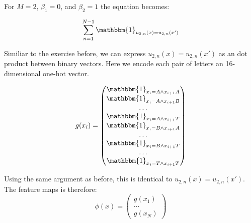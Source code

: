 For $M=2$, $\beta_1=0$, and $\beta_2=1$ the equation becomes:

\begin{equation}
    \sum_{n=1}^{N-1} \mathbbm{1}_{u_{2,n}(x) = u_{2,n}(x')}
\end{equation}

Similiar to the exercise before, we can express $u_{2,n}(x) = u_{2,n}(x')$
as an dot product between binary vectors. Here we encode each pair of letters
an 16-dimensional one-hot vector.

\begin{equation}
    g(x_i) = \begin{pmatrix}
            \mathbbm{1}_{x_i = A \land x_{i+1} A} \\
            \mathbbm{1}_{x_i = A \land x_{i+1} B} \\
            \ldots \\
            \mathbbm{1}_{x_i = A \land x_{i+1} T} \\
            \mathbbm{1}_{x_i = B \land x_{i+1} A} \\
            \ldots \\
            \mathbbm{1}_{x_i = B \land x_{i+1} T} \\
            \ldots \\
            \mathbbm{1}_{x_i = T \land x_{i+1} T} \\
    \end{pmatrix}
\end{equation}

Using the same argument as before, this is identical to $u_{2,n}(x) = u_{2,n}(x')$.
The feature maps is therefore:
\begin{equation}
\phi(x) =  \begin{pmatrix}
    g(x_1) \\
    \ldots \\
    g(x_N)
\end{pmatrix}
\end{equation}
